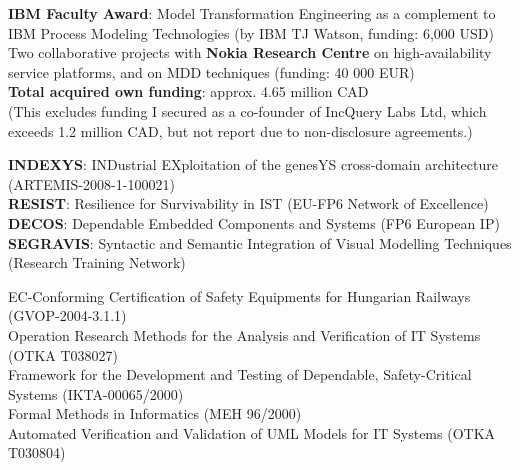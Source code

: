 \documentclass{xetexCV}
\begin{document}
\textbf{IBM Faculty Award}: Model Transformation Engineering as a
complement to IBM Process Modeling Technologies (by IBM TJ Watson, 
funding: 6,000 USD)  \\

Two collaborative projects with \textbf{Nokia Research Centre}
on high-availability service platforms, and on MDD%
techniques (funding: 40 000 EUR)\\

\textbf{Total acquired own funding}: approx. 4.65 million CAD\\
(This excludes funding I secured as a co-founder of IncQuery Labs Ltd, which exceeds 1.2 million CAD, but not report due to non-disclosure agreements.)


\textbf{INDEXYS}: INDustrial EXploitation of the genesYS
cross-domain architecture (ARTEMIS-2008-1-100021)  \\
\textbf{RESIST}: Resilience for Survivability in IST (EU-FP6
Network of Excellence)  \\
\textbf{DECOS}: Dependable Embedded Components and Systems (FP6
European IP) \\
\textbf{SEGRAVIS}: Syntactic and Semantic Integration of
Visual Modelling Techniques (Research Training Network) 


EC-Conforming  Certification of Safety Equipments for Hungarian
Railways (GVOP-2004-3.1.1) \\
Operation Research Methods  for the Analysis and Verification
of IT Systems (OTKA T038027) \\ 
Framework  for the Development and Testing of Dependable,
Safety-Critical Systems (IKTA-00065/2000) \\  
Formal Methods in Informatics (MEH 96/2000)  \\
Automated Verification  and Validation of UML Models for IT
Systems (OTKA T030804) 
\end{document}
